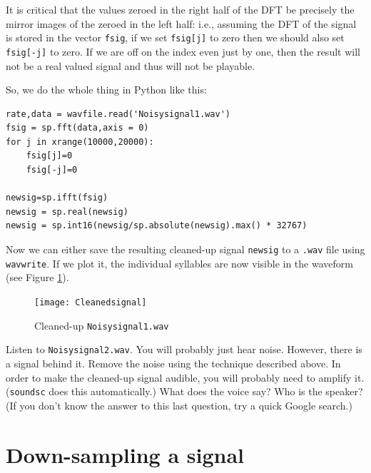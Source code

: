 It is critical that the values zeroed in the right half of the DFT be precisely the mirror images of the zeroed in the left half: i.e., assuming the DFT of the signal is stored in the vector \texttt{fsig}, if we set \texttt{fsig[j]} to zero then we should also set \texttt{fsig[-j]} to zero. If we are off on the index even just by one, then the result will not be a real valued signal and thus will not be playable.

So, we do the whole thing in Python like this:
\begin{lstlisting}
rate,data = wavfile.read('Noisysignal1.wav')
fsig = sp.fft(data,axis = 0)
for j in xrange(10000,20000):
    fsig[j]=0
    fsig[-j]=0

newsig=sp.ifft(fsig)
newsig = sp.real(newsig)
newsig = sp.int16(newsig/sp.absolute(newsig).max() * 32767)
\end{lstlisting}

Now we can either save the resulting cleaned-up signal \texttt{newsig} to a \texttt{.wav} file using \texttt{wavwrite}. If we plot it, the individual syllables are now visible in the waveform (see Figure \ref{cleansignal}).

\begin{figure}[ht]\caption{Cleaned-up \texttt{Noisysignal1.wav} }\label{cleansignal}\centering\texttt{[image: Cleanedsignal]}\end{figure}

\begin{problem}
Listen to \texttt{Noisysignal2.wav}. You will probably just hear noise. However, there is a signal behind it. Remove the noise using the technique described above. In order to make the cleaned-up signal audible, you will probably need to amplify it. (\texttt{soundsc} does this automatically.) What does the voice say? Who is the speaker? (If you don't know the answer to this last question, try a quick Google search.)
\end{problem}

\section*{Down-sampling a signal}

